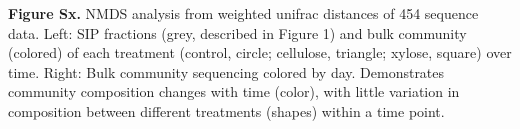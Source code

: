 \textbf{Figure Sx.} NMDS analysis from weighted unifrac distances of 454 sequence data. Left: SIP fractions (grey, described in Figure 1) and bulk community (colored) of each treatment (control, circle; cellulose, triangle; xylose, square) over time. Right: Bulk community sequencing colored by day.  Demonstrates community composition changes with time (color), with little variation in composition between different treatments (shapes) within a time point.     